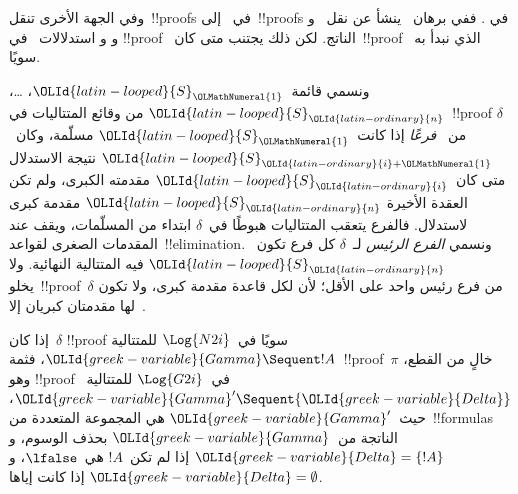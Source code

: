 \documentclass[../../../include/open-logic-section]{subfiles}
\begin{document}
وفي الجهة الأخرى تنقل~!!{proof}s في~ إلى~!!{proof}s في
. ففي برهان~ ينشأ عن نقل~\Elim{\land} و
\Elim{\lif} و\Elim{\lnot} و\Elim{\lforall} استدلالات~\Cut{} في
!!{proof}~ الناتج. لكن ذلك يجتنب متى كان~!!{proof}~
الذي نبدأ به سويًا.

ونسمي قائمة~${\OLId{latin-looped}{S}}_{\OLMathNumeral{1}}$، \dots، ${\OLId{latin-looped}{S}}_{\OLId{latin-ordinary}{n}}$ من وقائع المتتاليات في~!!{proof}
$\delta$ من~ \emph{فرعًا} إذا كانت~${\OLId{latin-looped}{S}}_{\OLMathNumeral{1}}$ مسلّمة، وكان~${\OLId{latin-looped}{S}}_{{\OLId{latin-ordinary}{i}}+{\OLMathNumeral{1}}}$
نتيجة الاستدلال متى كان~${\OLId{latin-looped}{S}}_{\OLId{latin-ordinary}{i}}$ مقدمته الكبرى، ولم تكن العقدة الأخيرة
${\OLId{latin-looped}{S}}_{\OLId{latin-ordinary}{n}}$ مقدمة كبرى لاستدلال. فالفرع يتعقب المتتاليات هبوطًا في~$\delta$
ابتداء من المسلّمات، ويقف عند المقدمات الصغرى لقواعد~!!{elimination}.
ونسمي \emph{الفرع الرئيس} لـ~$\delta$ كل فرع تكون~${\OLId{latin-looped}{S}}_{\OLId{latin-ordinary}{n}}$ فيه المتتالية
النهائية. ولا يخلو~!!{proof}~$\delta$ من فرع رئيس واحد على الأقل؛ لأن
لكل قاعدة مقدمة كبرى، ولا تكون لها مقدمتان كبريان إلا~\Intro{\land}.

\begin{prop}
إذا كان~$\delta$ !!{proof} سويًا في~$\Log{N2i}$ للمتتالية
${\OLId{greek-variable}{Gamma}} \Sequent !A$، فثمة~!!{proof}~$\pi$ خالٍ من القطع، وهو
!!{proof} في~$\Log{G2i}$
للمتتالية~${\OLId{greek-variable}{Gamma}}' \Sequent {\OLId{greek-variable}{Delta}}$، حيث~${\OLId{greek-variable}{Gamma}}'$ هي المجموعة المتعددة
من~!!{formula}s الناتجة من~${\OLId{greek-variable}{Gamma}}$ بحذف الوسوم، و
${\OLId{greek-variable}{Delta}}=\{!A\}$ إذا لم تكن~$!A$ هي~$\lfalse$، و
${\OLId{greek-variable}{Delta}}=\emptyset$ إذا كانت إياها.
\end{prop}
\end{document}
